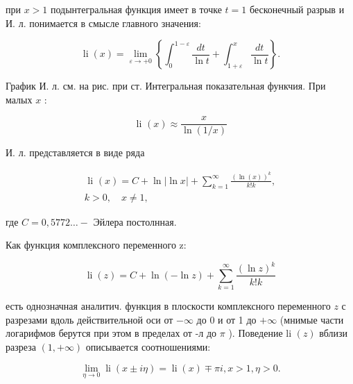 \documentclass[10pt]{article}
\begin{document}
при $x>1$ подынтегральная функция имеет в точке $t=1$ бесконечный разрыв и И. л. понимается в смысле главного значения:



\[

\operatorname{li}(x)=\lim _{\varepsilon \rightarrow+0}\left\{\int_{0}^{1-\varepsilon} \frac{d t}{\ln t}+\int_{1+\varepsilon}^{x} \frac{d t}{\ln t}\right\} .

\]



График И. л. см. на рис. при ст. Интегральная показательная функчия. При малых $x$ :



\[

\text { li }(x) \approx \frac{x}{\ln (1 / x)}

\]



И. л. представляется в виде ряда



\[

\begin{gathered}

\text { li }(x)=C+\ln |\ln x|+\sum_{k=1}^{\infty} \frac{(\ln (x))^{k}}{k ! k}, \\

k>0, \quad x \neq 1,

\end{gathered}

\]



где $C=0,5772 \ldots-$ Эйлера постолнная.



Как функция комплексного переменного z:



\[

\operatorname{li}(z)=C+\ln (-\ln z)+\sum_{k=1}^{\infty} \frac{(\ln z)^{k}}{k ! k}

\]



есть однозначная аналитич. функция в плоскости комплексного переменного $z$ с разрезами вдоль действительной оси от $-\infty$ до 0 и от 1 до $+\infty$ (мнимые части логарифмов берутся при этом в пределах от -л до $\pi$ ). Поведение li $(z)$ вблизи разреза $(1,+\infty)$ описывается соотношениями:



\[

\lim _{\eta \rightarrow 0} \operatorname{li}(x \pm i \eta)=\operatorname{li}(x) \mp \pi i, x>1, \eta>0 .

\]
\end{document}
